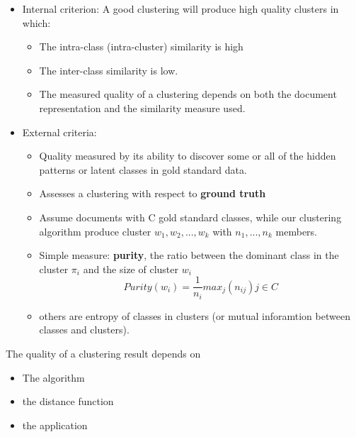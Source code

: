 \documentclass[
]{book}
\providecommand{\tightlist}{%
  \setlength{\itemsep}{0pt}\setlength{\parskip}{0pt}}
\begin{document}
\begin{itemize}
\item
  Internal criterion: A good clustering will produce high quality clusters in which:

  \begin{itemize}
  \tightlist
  \item
    The intra-class (intra-cluster) similarity is high\\
  \item
    The inter-class similarity is low.\\
  \item
    The measured quality of a clustering depends on both the document representation and the similarity measure used.\\
  \end{itemize}
\item
  External criteria:

  \begin{itemize}
  \tightlist
  \item
    Quality measured by its ability to discover some or all of the hidden patterns or latent classes in gold standard data.\\
  \item
    Assesses a clustering with respect to \textbf{ground truth}\\
  \item
    Assume documents with C gold standard classes, while our clustering algorithm produce cluster \(w_1,w_2,...,w_k\) with \(n_1,...,n_k\) members.\\
  \item
    Simple measure: \textbf{purity}, the ratio between the dominant class in the cluster \(\pi_i\) and the size of cluster \(w_i\)\\
    \[
    Purity(w_i) = \frac{1}{n_i}max_j (n_{ij})  j \in C
    \]
  \item
    others are entropy of classes in clusters (or mutual inforamtion between classes and clusters).
  \end{itemize}
\end{itemize}

The quality of a clustering result depends on

\begin{itemize}
\tightlist
\item
  The algorithm\\
\item
  the distance function\\
\item
  the application
\end{itemize}
\end{document}
